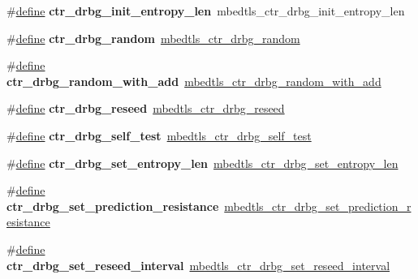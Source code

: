 \begin{DoxyCompactItemize}
\#\hyperlink{structdefine}{define} {\bfseries ctr\+\_\+drbg\+\_\+init\+\_\+entropy\+\_\+len}~mbedtls\+\_\+ctr\+\_\+drbg\+\_\+init\+\_\+entropy\+\_\+len
\item 
\mbox{\label{compat-1_83_8h_aae6165e1fba059977940fd88ecafe60f}} 
\#\hyperlink{structdefine}{define} {\bfseries ctr\+\_\+drbg\+\_\+random}~\hyperlink{ctr__drbg_8h_af6e4dd295ae790a33128562dd01c79ab}{mbedtls\+\_\+ctr\+\_\+drbg\+\_\+random}
\item 
\mbox{\label{compat-1_83_8h_aa22703b62e552d8068a7b6702dd66d1c}} 
\#\hyperlink{structdefine}{define} {\bfseries ctr\+\_\+drbg\+\_\+random\+\_\+with\+\_\+add}~\hyperlink{ctr__drbg_8h_a18161010cbcf33f6930fa8fdc035e74d}{mbedtls\+\_\+ctr\+\_\+drbg\+\_\+random\+\_\+with\+\_\+add}
\item 
\mbox{\label{compat-1_83_8h_a6b5ceba46a5a41b7eb0b004c70d86637}} 
\#\hyperlink{structdefine}{define} {\bfseries ctr\+\_\+drbg\+\_\+reseed}~\hyperlink{ctr__drbg_8h_a495e3c86df7fc166454d0e85262e40a6}{mbedtls\+\_\+ctr\+\_\+drbg\+\_\+reseed}
\item 
\mbox{\label{compat-1_83_8h_a8793d72af9843c90402548be972359d3}} 
\#\hyperlink{structdefine}{define} {\bfseries ctr\+\_\+drbg\+\_\+self\+\_\+test}~\hyperlink{ctr__drbg_8h_a6f4c2d5ae50d4f122a6a1468480a9c3e}{mbedtls\+\_\+ctr\+\_\+drbg\+\_\+self\+\_\+test}
\item 
\mbox{\label{compat-1_83_8h_a1523d9cd0f3cc2410256d2bf1650b45e}} 
\#\hyperlink{structdefine}{define} {\bfseries ctr\+\_\+drbg\+\_\+set\+\_\+entropy\+\_\+len}~\hyperlink{ctr__drbg_8h_af33ced4a1fc79c6abbc1cb2b17f14549}{mbedtls\+\_\+ctr\+\_\+drbg\+\_\+set\+\_\+entropy\+\_\+len}
\item 
\mbox{\label{compat-1_83_8h_a4607646f416f44654c0556013064c5d3}} 
\#\hyperlink{structdefine}{define} {\bfseries ctr\+\_\+drbg\+\_\+set\+\_\+prediction\+\_\+resistance}~\hyperlink{ctr__drbg_8h_ae9871c5ba6b2fa5189423ef7cbe2078b}{mbedtls\+\_\+ctr\+\_\+drbg\+\_\+set\+\_\+prediction\+\_\+resistance}
\item 
\mbox{\label{compat-1_83_8h_af494c21e52aee7b5dcc74051d5e26a17}} 
\#\hyperlink{structdefine}{define} {\bfseries ctr\+\_\+drbg\+\_\+set\+\_\+reseed\+\_\+interval}~\hyperlink{ctr__drbg_8h_aefd5f442f96682f0cef0152866e4e46e}{mbedtls\+\_\+ctr\+\_\+drbg\+\_\+set\+\_\+reseed\+\_\+interval}

\end{DoxyCompactItemize}
